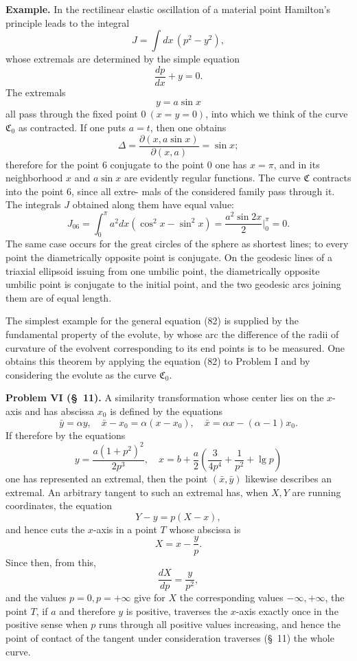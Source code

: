 \documentclass[11pt,a4paper,leqno]{article}
\providecommand{\lg}{\operatorname{lg}}
\begin{document}
\noindent\textbf{Example.} In the rectilinear elastic oscillation of a material point Hamilton's principle leads to the integral
\[
J=\int dx\,(p^2-y^2),
\]
whose extremals are determined by the simple equation
\[
\frac{dp}{dx}+y=0.
\]
The extremals
\[
y=a\sin x
\]
all pass through the fixed point $0\ (x=y=0)$, into which we think of the curve $\mathfrak{C}_0$ as contracted. If one puts $a=t$, then one obtains
\[
\Delta=\frac{\partial(x,a\sin x)}{\partial(x,a)}=\sin x;
\]
therefore for the point 6 conjugate to the point 0 one has $x=\pi$, and in its neighborhood $x$ and $a\sin x$ are evidently regular functions. The curve $\mathfrak{C}$ contracts into the point 6, since all extre-
mals of the considered family pass through it. The integrals $J$ obtained along them have equal value:
\[
J_{06}=\int_0^\pi a^2dx(\cos^2x-\sin^2x)
=\frac{a^2\sin2x}{2}\bigg|_0^\pi=0.
\]
The same case occurs for the great circles of the sphere as shortest lines; to every point the diametrically opposite point is conjugate. On the geodesic lines of a triaxial ellipsoid issuing from one umbilic point, the diametrically opposite umbilic point is conjugate to the initial point, and the two geodesic arcs joining them are of equal length.

The simplest example for the general equation (82) is supplied by the fundamental property of the evolute, by whose arc the difference of the radii of curvature of the evolvent corresponding to its end points is to be measured. One obtains this theorem by applying the equation (82) to Problem I and by considering the evolute as the curve $\mathfrak{C}_0$.

\noindent\textbf{Problem VI (\S~11).} A similarity transformation whose center lies on the $x$-axis and has abscissa $x_0$ is defined by the equations
\[
\bar y=\alpha y,
\quad
\bar x-x_0=\alpha(x-x_0),
\quad
\bar x=\alpha x-(\alpha-1)x_0.
\]
If therefore by the equations
\[
y=\frac{a(1+p^2)^2}{2p^3},
\quad
x=b+\frac{a}{2}\left(\frac{3}{4p^4}+\frac{1}{p^2}+\lg p\right)
\]
one has represented an extremal, then the point $(\bar x,\bar y)$ likewise describes an extremal. An arbitrary tangent to such an extremal has, when $X,Y$ are running coordinates, the equation
\[
Y-y=p(X-x),
\]
and hence cuts the $x$-axis in a point $T$ whose abscissa is
\[
X=x-\frac{y}{p}.
\]
Since then, from this,
\[
\frac{dX}{dp}=\frac{y}{p^2},
\]
and the values $p=0,p=+\infty$ give for $X$ the corresponding values $-\infty,+\infty$, the point $T$, if $a$ and therefore $y$ is positive, traverses the $x$-axis exactly once in the positive sense when
$p$ runs through all positive values increasing, and hence the point of contact of the tangent under consideration traverses (\S~11) the whole curve.
\end{document}
